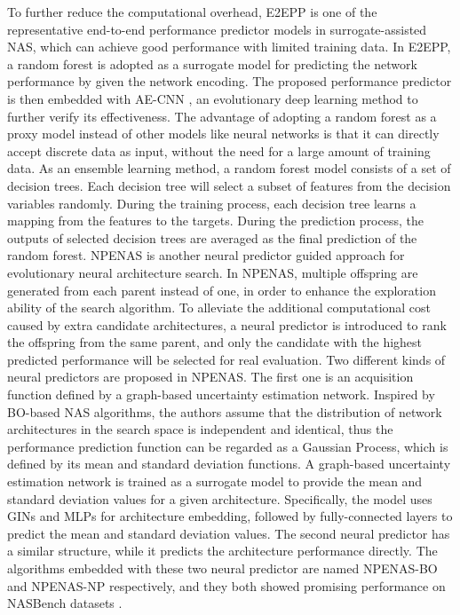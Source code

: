 \documentclass[journal]{IEEEtran}
\begin{document}
To further reduce the computational overhead, E2EPP \cite{sun2019surrogate} is one of the representative end-to-end performance predictor models in surrogate-assisted NAS, which can achieve good performance with limited training data. In E2EPP, a random forest \cite{ho1995random} is adopted as a surrogate model for predicting the network performance by given the network encoding. The proposed performance predictor is then embedded with AE-CNN \cite{sun2019completely}, an evolutionary deep learning method to further verify its effectiveness. The advantage of adopting a random forest as a proxy model instead of other models like neural networks is that it can directly accept discrete data as input, without the need for a large amount of training data. As an ensemble learning method, a random forest model consists of a set of decision trees. Each decision tree will select a subset of features from the decision variables randomly. During the training process, each decision tree learns a mapping from the features to the targets. During the prediction process, the outputs of selected decision trees are averaged as the final prediction of the random forest.
NPENAS \cite{wei2020npenas} is another neural predictor guided approach for evolutionary neural architecture search. In NPENAS, multiple offspring are generated from each parent instead of one, in order to enhance the exploration ability of the search algorithm. To alleviate the additional computational cost caused by extra candidate architectures, a neural predictor is introduced to rank the offspring from the same parent, and only the candidate with the highest predicted performance will be selected for real evaluation. Two different kinds of neural predictors are proposed in NPENAS. The first one is an acquisition function defined by a graph-based uncertainty estimation network. Inspired by BO-based NAS algorithms, the authors assume that the distribution of network architectures in the search space is independent and identical, thus the performance prediction function can be regarded as a Gaussian Process, which is defined by its mean and standard deviation functions. A graph-based uncertainty estimation network is trained as a surrogate model to provide the mean and standard deviation values for a given architecture. Specifically, the model uses GINs \cite{xu2018powerful} and MLPs for architecture embedding, followed by fully-connected layers to predict the mean and standard deviation values. The second neural predictor has a similar structure, while it predicts the architecture performance directly. The algorithms embedded with these two neural predictor are named NPENAS-BO and NPENAS-NP respectively, and they both showed promising performance on NASBench datasets \cite{ying2019bench, dong2020bench}.
\end{document}
